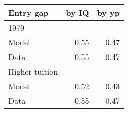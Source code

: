 \begin{tabular}{lrr}
\hline
Entry gap & by IQ  & by yp  \\ 
\hline
1979 &   &   \\ 
Model & 0.55  & 0.47  \\ 
Data & 0.55  & 0.47  \\ 
Higher tuition &   &   \\ 
Model & 0.52  & 0.43  \\ 
Data & 0.55  & 0.47  \\ 
\hline
\end{tabular}%
